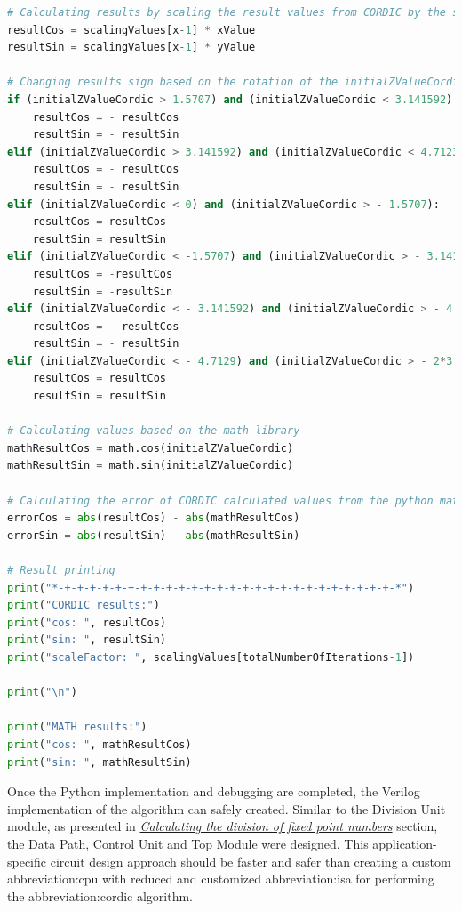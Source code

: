 \documentclass[a4paper, twoside, 11pt]{article}
\begin{document}
\begin{lstlisting}[language={python}, caption={Python code of \gls{abbreviation:cordic} implementation.}, label= {lst:python-cordic}]
# Calculating results by scaling the result values from CORDIC by the scalingValue which depends on number of iterations which were made
resultCos = scalingValues[x-1] * xValue
resultSin = scalingValues[x-1] * yValue

# Changing results sign based on the rotation of the initialZValueCordic
if (initialZValueCordic > 1.5707) and (initialZValueCordic < 3.141592):
    resultCos = - resultCos
    resultSin = - resultSin
elif (initialZValueCordic > 3.141592) and (initialZValueCordic < 4.7123):
    resultCos = - resultCos
    resultSin = - resultSin
elif (initialZValueCordic < 0) and (initialZValueCordic > - 1.5707):
    resultCos = resultCos
    resultSin = resultSin
elif (initialZValueCordic < -1.5707) and (initialZValueCordic > - 3.141592):
    resultCos = -resultCos
    resultSin = -resultSin
elif (initialZValueCordic < - 3.141592) and (initialZValueCordic > - 4.7129):
    resultCos = - resultCos
    resultSin = - resultSin
elif (initialZValueCordic < - 4.7129) and (initialZValueCordic > - 2*3.141592):
    resultCos = resultCos
    resultSin = resultSin

# Calculating values based on the math library
mathResultCos = math.cos(initialZValueCordic)
mathResultSin = math.sin(initialZValueCordic)

# Calculating the error of CORDIC calculated values from the python math functions
errorCos = abs(resultCos) - abs(mathResultCos)
errorSin = abs(resultSin) - abs(mathResultSin)

# Result printing
print("*-+-+-+-+-+-+-+-+-+-+-+-+-+-+-+-+-+-+-+-+-+-+-+-+-+-+-*")
print("CORDIC results:")
print("cos: ", resultCos)
print("sin: ", resultSin)
print("scaleFactor: ", scalingValues[totalNumberOfIterations-1])

print("\n")

print("MATH results:")
print("cos: ", mathResultCos)
print("sin: ", mathResultSin)

\end{lstlisting}

\par
Once the Python implementation and debugging are completed, the Verilog implementation of the algorithm can safely created. Similar to the Division Unit module, as presented in \hyperref[sec:calculating-the-division-of-fixed-point-numbers]{\textit{Calculating the division of fixed point numbers}} section, the Data Path, Control Unit and Top Module were designed. This application-specific circuit design approach should be faster and safer than creating a custom \gls{abbreviation:cpu} with reduced and customized \gls{abbreviation:isa} for performing the \gls{abbreviation:cordic} algorithm.
\end{document}
